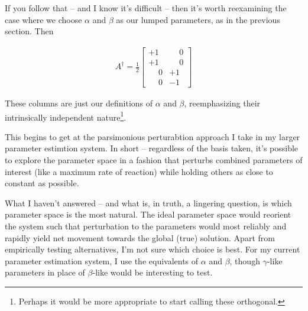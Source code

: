 \documentclass{article}
\begin{document}
If you follow that -- and I know it's difficult -- then it's worth reexamining the case where we choose \(\alpha\) and \(\beta\) as our lumped parameters, as in the previous section.  Then

\begin{align}
A^\dagger = \frac{1}{2} \begin{bmatrix}
+1 & \phantom{\pm}0 \\
+1 & \phantom{\pm}0 \\
\phantom{\pm}0 & +1 \\
\phantom{\pm}0 & -1
\end{bmatrix}
\end{align}

These columns are just our definitions of \(\alpha\) and \(\beta\), reemphasizing their intrinsically independent nature\footnote{Perhaps it would be more appropriate to start calling these orthogonal.}.

This begins to get at the parsimonious perturabtion approach I take in my larger parameter estimtion system.  In short -- regardless of the basis taken, it's possible to explore the parameter space in a fashion that perturbs combined parameters of interest (like a maximum rate of reaction) while holding others as close to constant as possible.

What I haven't answered -- and what is, in truth, a lingering question, is which parameter space is the most natural.  The ideal parameter space would reorient the system such that perturbation to the parameters would most reliably and rapidly yield net movement towards the global (true) solution.  Apart from empirically testing alternatives, I'm not sure which choice is best.  For my current parameter estimation system, I use the equivalents of \(\alpha\) and \(\beta\), though \(\gamma\)-like parameters in place of \(\beta\)-like would be interesting to test.
\end{document}
